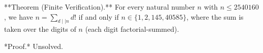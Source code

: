 
**Theorem (Finite Verification).** For every natural number $n$ with $n \leq 2540160$, we have $n = \sum_{d \mid\mid n} d!$ if and only if $n \in \{1, 2, 145, 40585\}$, where the sum is taken over the digits of $n$ (each digit factorial-summed).

*Proof.* Unsolved.